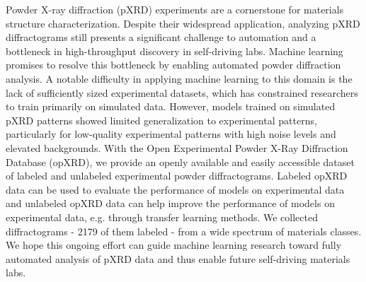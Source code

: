 Powder X-ray diffraction (pXRD) experiments are a cornerstone for materials structure characterization.
Despite their widespread application, analyzing pXRD diffractograms still presents a significant challenge to automation and a bottleneck in high-throughput discovery in self-driving labs.
Machine learning promises to resolve this bottleneck by enabling automated powder diffraction analysis.
A notable difficulty in applying machine learning to this domain is the lack of sufficiently sized experimental datasets, which has constrained researchers to train primarily on simulated data. However, models trained on simulated pXRD patterns showed limited generalization to experimental patterns, particularly for low-quality experimental patterns with high noise levels and elevated backgrounds.
With the Open Experimental Powder X-Ray Diffraction Database (opXRD), we provide an openly available and easily accessible dataset of labeled and unlabeled experimental powder diffractograms.
Labeled opXRD data can be used to evaluate the performance of models on experimental data and unlabeled opXRD data can help improve the performance of models on experimental data, e.g. through transfer learning methods.
We collected \numpatterns diffractograms - 2179 of them labeled - from a wide spectrum of materials classes.
We hope this ongoing effort can guide machine learning research toward fully automated analysis of pXRD data and thus enable future self-driving materials labs.